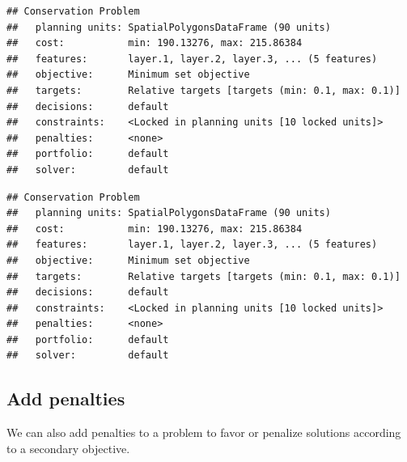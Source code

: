 \documentclass[
  12pt,
]{book}
\newenvironment{Shaded}{\begin{snugshade}}{\end{snugshade}}
\newcommand{\AttributeTok}[1]{\textcolor[rgb]{0.77,0.63,0.00}{#1}}
\newcommand{\CommentTok}[1]{\textcolor[rgb]{0.56,0.35,0.01}{\textit{#1}}}
\newcommand{\FloatTok}[1]{\textcolor[rgb]{0.00,0.00,0.81}{#1}}
\newcommand{\FunctionTok}[1]{\textcolor[rgb]{0.00,0.00,0.00}{#1}}
\newcommand{\NormalTok}[1]{#1}
\newcommand{\OtherTok}[1]{\textcolor[rgb]{0.56,0.35,0.01}{#1}}
\newcommand{\SpecialCharTok}[1]{\textcolor[rgb]{0.00,0.00,0.00}{#1}}
\newcommand{\StringTok}[1]{\textcolor[rgb]{0.31,0.60,0.02}{#1}}
\begin{document}
\begin{verbatim}
## Conservation Problem
##   planning units: SpatialPolygonsDataFrame (90 units)
##   cost:           min: 190.13276, max: 215.86384
##   features:       layer.1, layer.2, layer.3, ... (5 features)
##   objective:      Minimum set objective 
##   targets:        Relative targets [targets (min: 0.1, max: 0.1)]
##   decisions:      default
##   constraints:    <Locked in planning units [10 locked units]>
##   penalties:      <none>
##   portfolio:      default
##   solver:         default
\end{verbatim}

\begin{Shaded}
\end{Shaded}

\begin{verbatim}
## Conservation Problem
##   planning units: SpatialPolygonsDataFrame (90 units)
##   cost:           min: 190.13276, max: 215.86384
##   features:       layer.1, layer.2, layer.3, ... (5 features)
##   objective:      Minimum set objective 
##   targets:        Relative targets [targets (min: 0.1, max: 0.1)]
##   decisions:      default
##   constraints:    <Locked in planning units [10 locked units]>
##   penalties:      <none>
##   portfolio:      default
##   solver:         default
\end{verbatim}

\hypertarget{add-penalties}{%
\subsection{Add penalties}\label{add-penalties}}

We can also add penalties to a problem to favor or penalize solutions according to a secondary objective.
\end{document}
